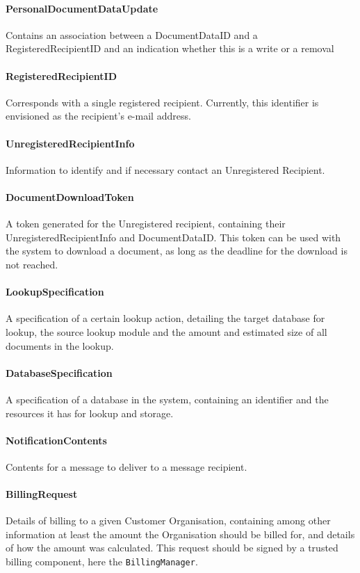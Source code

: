 \documentclass[a4paper,10pt]{article}
\begin{document}
\paragraph{PersonalDocumentDataUpdate} Contains an association between a DocumentDataID and a RegisteredRecipientID and an indication whether this is a write or a removal

\paragraph{RegisteredRecipientID} Corresponds with a single registered recipient. Currently, this identifier is envisioned as the recipient's e-mail address.

\paragraph{UnregisteredRecipientInfo} Information to identify and if necessary contact an Unregistered Recipient.

\paragraph{DocumentDownloadToken} A token generated for the Unregistered recipient, containing their UnregisteredRecipientInfo and DocumentDataID. This token can be used with the system to download a document, as long as the deadline for the download is not reached.

\paragraph{LookupSpecification} A specification of a certain lookup action, detailing the target database for lookup, the source lookup module and the amount and estimated size of all documents in the lookup.

\paragraph{DatabaseSpecification} A specification of a database in the system, containing an identifier and the resources it has for lookup and storage.

\paragraph{NotificationContents} Contents for a message to deliver to a message recipient.

\paragraph{BillingRequest} Details of billing to a given Customer Organisation, containing among other information at least the amount the Organisation should be billed for, and details of how the amount was calculated. This request should be signed by a trusted billing component, here the \texttt{BillingManager}.
\end{document}
